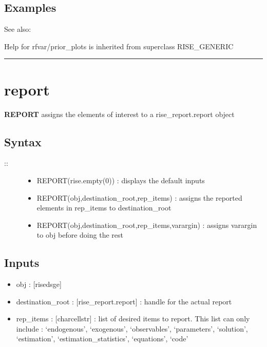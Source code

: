 \documentclass[letterpaper,10pt,english]{sphinxmanual}
\begin{document}
\subsection{Examples}
\label{classes/models/@rfvar/rfvar:id102}
See also:

Help for rfvar/prior\_plots is inherited from superclass RISE\_GENERIC


\bigskip\hrule{}\bigskip



\section{report}
\label{classes/models/@rfvar/rfvar:report}\label{classes/models/@rfvar/rfvar:id103}
\textbf{REPORT} assigns the elements of interest to a rise\_report.report object


\subsection{Syntax}
\label{classes/models/@rfvar/rfvar:id104}\begin{description}
\item[{::}] \leavevmode\begin{itemize}
\item {} 
REPORT(rise.empty(0)) : displays the default inputs

\item {} 
REPORT(obj,destination\_root,rep\_items) : assigns the reported
elements in rep\_items to destination\_root

\item {} 
REPORT(obj,destination\_root,rep\_items,varargin) : assigns varargin to
obj before doing the rest

\end{itemize}

\end{description}


\subsection{Inputs}
\label{classes/models/@rfvar/rfvar:id105}\begin{itemize}
\item {} 
obj : {[}rise\textbar{}dsge{]}

\item {} 
destination\_root : {[}rise\_report.report{]} : handle for the actual report

\item {} 
rep\_items : {[}char\textbar{}cellstr{]} : list of desired items to report. This list
can only include : `endogenous', `exogenous', `observables',
`parameters', `solution', `estimation', `estimation\_statistics',
`equations', `code'

\end{itemize}
\end{document}
